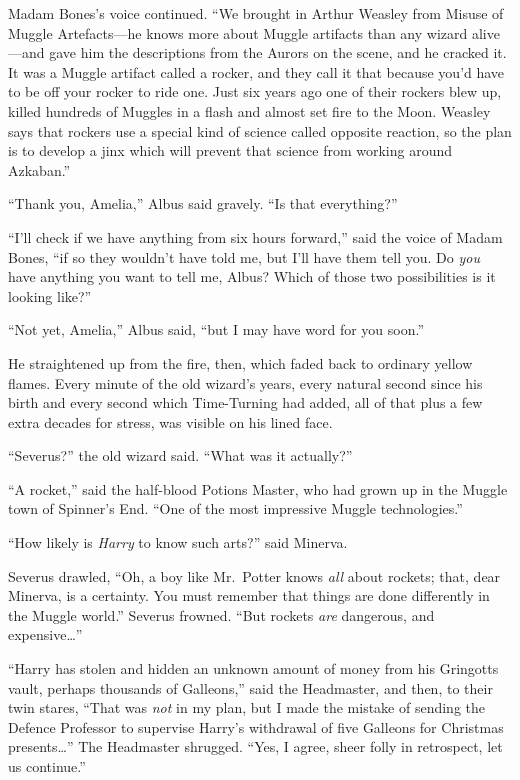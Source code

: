 Madam Bones's voice continued. ``We brought in Arthur Weasley from
Misuse of Muggle Artefacts---he knows more about Muggle artifacts than
any wizard alive---and gave him the descriptions from the Aurors on the
scene, and he cracked it. It was a Muggle artifact called a rocker, and
they call it that because you'd have to be off your rocker to ride one.
Just six years ago one of their rockers blew up, killed hundreds of
Muggles in a flash and almost set fire to the Moon. Weasley says that
rockers use a special kind of science called opposite reaction, so the
plan is to develop a jinx which will prevent that science from working
around Azkaban.''

``Thank you, Amelia,'' Albus said gravely. ``Is that everything?''

``I'll check if we have anything from six hours forward,'' said the
voice of Madam Bones, ``if so they wouldn't have told me, but I'll have
them tell you. Do \emph{you} have anything you want to tell me, Albus?
Which of those two possibilities is it looking like?''

``Not yet, Amelia,'' Albus said, ``but I may have word for you soon.''

He straightened up from the fire, then, which faded back to ordinary
yellow flames. Every minute of the old wizard's years, every natural
second since his birth and every second which Time-Turning had added,
all of that plus a few extra decades for stress, was visible on his
lined face.

``Severus?'' the old wizard said. ``What was it actually?''

``A rocket,'' said the half-blood Potions Master, who had grown up in
the Muggle town of Spinner's End. ``One of the most impressive Muggle
technologies.''

``How likely is \emph{Harry} to know such arts?'' said Minerva.

Severus drawled, ``Oh, a boy like Mr.~Potter knows \emph{all} about
rockets; that, dear Minerva, is a certainty. You must remember that
things are done differently in the Muggle world.'' Severus frowned.
``But rockets \emph{are} dangerous, and expensive\ldots{}''

``Harry has stolen and hidden an unknown amount of money from his
Gringotts vault, perhaps thousands of Galleons,'' said the Headmaster,
and then, to their twin stares, ``That was \emph{not} in my plan, but I
made the mistake of sending the Defence Professor to supervise Harry's
withdrawal of five Galleons for Christmas presents\ldots{}'' The
Headmaster shrugged. ``Yes, I agree, sheer folly in retrospect, let us
continue.''

